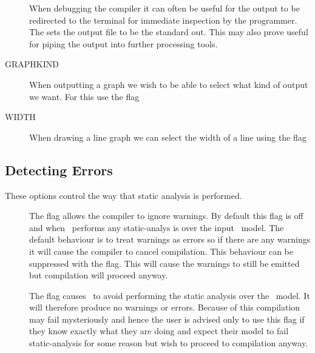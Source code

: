 \begin{description}
\item[ ]
When debugging the compiler it can often be useful
for the output to be redirected to the terminal for
immediate inspection by the programmer.
The  sets the output file to be
the standard out. This may also prove useful for
piping the output into further processing tools.

\end{description}

\begin{description}
\item[ GRAPHKIND]
When outputting a graph we wish to be able to select
what kind of output we want.
For this use the  flag

\end{description}

\begin{description}
\item[ WIDTH]
When drawing a line graph we can select the width of a line
using the  flag

\end{description}


\subsection{Detecting Errors}
These options control the way that
static analysis is performed.

\begin{description}
\item[ ]
The flag  allows the compiler
to ignore warnings.
By default this flag is off and when \commandNameIpcSmc\ performs
any static-analys is over the input \pepa\ model.
The default behaviour is to treat warnings as errors so
if there are any warnings it will cause the compiler
to cancel compilation. This behaviour can be suppressed with
the  flag. This will cause the warnings
to still be emitted but compilation will proceed anyway.

\end{description}

\begin{description}
\item[ ]
The flag  causes
\commandNameIpcSmc\ to avoid performing the static analysis over
the \pepa\ model. It will therefore produce no
warnings or errors. Because of this compilation may fail
mysteriously and hence the user is advised only to use this
flag if they know exactly what they are doing and expect
their model to fail static-analysis for some reason but
wish to proceed to compilation anyway.

\end{description}


